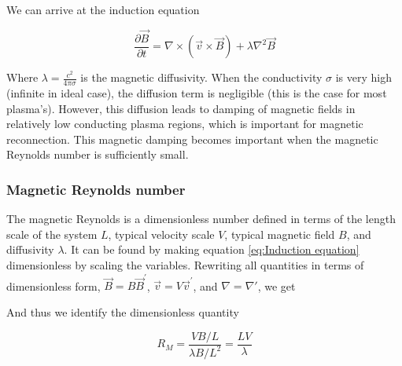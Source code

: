 \documentclass{article}
\begin{document}
We can arrive at the induction equation

\begin{equation}\label{eq:Induction equation}
    \frac{\partial \Vec{B}}{\partial t} = \nabla \times (\Vec{v} \times \Vec{B}) + \lambda \nabla^2 \Vec{B}
\end{equation}

Where $\lambda = \frac{c^2}{4 \pi \sigma}$ is the magnetic diffusivity. When the conductivity $\sigma$ is very high (infinite in ideal case), the diffusion term is negligible (this is the case for most plasma's). However, this diffusion leads to damping of magnetic fields in relatively low conducting plasma regions, which is important for magnetic reconnection. This magnetic damping becomes important when the magnetic Reynolds number is sufficiently small.

\subsubsection{Magnetic Reynolds number}

The magnetic Reynolds is a dimensionless number defined in terms of the length scale of the system $L$, typical velocity scale $V$, typical magnetic field $B$, and diffusivity $\lambda$. It can be found by making equation \ref{eq:Induction equation} dimensionless by scaling the variables. Rewriting all quantities in terms of dimensionless form, $\Vec{B} = B\Vec{B}^'$, $\Vec{v} = V \Vec{v}^'$, and $\nabla=\nabla'$, we get 

    



And thus we identify the dimensionless quantity

\begin{equation}\label{eq:Magnetic Reynolds number}
    R_M = \frac{V B/L}{\lambda B / L^2} = \frac{L V}{\lambda}
\end{equation}
\end{document}
